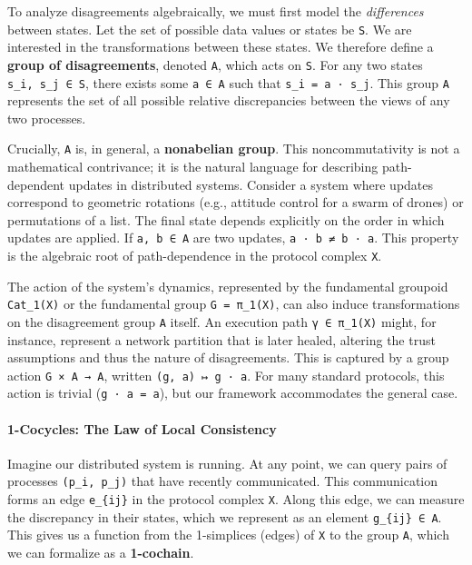 \documentclass[
]{article}
\begin{document}
To analyze disagreements algebraically, we must first model the
\emph{differences} between states. Let the set of possible data values
or states be \texttt{S}. We are interested in the transformations
between these states. We therefore define a \textbf{group of
disagreements}, denoted \texttt{A}, which acts on \texttt{S}. For any
two states \texttt{s\_i,\ s\_j\ ∈\ S}, there exists some
\texttt{a\ ∈\ A} such that \texttt{s\_i\ =\ a\ ·\ s\_j}. This group
\texttt{A} represents the set of all possible relative discrepancies
between the views of any two processes.

Crucially, \texttt{A} is, in general, a \textbf{nonabelian group}. This
noncommutativity is not a mathematical contrivance; it is the natural
language for describing path-dependent updates in distributed systems.
Consider a system where updates correspond to geometric rotations (e.g.,
attitude control for a swarm of drones) or permutations of a list. The
final state depends explicitly on the order in which updates are
applied. If \texttt{a,\ b\ ∈\ A} are two updates,
\texttt{a\ ·\ b\ ≠\ b\ ·\ a}. This property is the algebraic root of
path-dependence in the protocol complex \texttt{X}.

The action of the system's dynamics, represented by the fundamental
groupoid \texttt{Cat\_1(X)} or the fundamental group
\texttt{G\ =\ π\_1(X)}, can also induce transformations on the
disagreement group \texttt{A} itself. An execution path
\texttt{γ\ ∈\ π\_1(X)} might, for instance, represent a network
partition that is later healed, altering the trust assumptions and thus
the nature of disagreements. This is captured by a group action
\texttt{G\ ×\ A\ →\ A}, written \texttt{(g,\ a)\ ↦\ g\ ·\ a}. For many
standard protocols, this action is trivial (\texttt{g\ ·\ a\ =\ a}), but
our framework accommodates the general case.

\paragraph{1-Cocycles: The Law of Local
Consistency}\label{cocycles-the-law-of-local-consistency}

Imagine our distributed system is running. At any point, we can query
pairs of processes \texttt{(p\_i,\ p\_j)} that have recently
communicated. This communication forms an edge \texttt{e\_\{ij\}} in the
protocol complex \texttt{X}. Along this edge, we can measure the
discrepancy in their states, which we represent as an element
\texttt{g\_\{ij\}\ ∈\ A}. This gives us a function from the 1-simplices
(edges) of \texttt{X} to the group \texttt{A}, which we can formalize as
a \textbf{1-cochain}.
\end{document}
